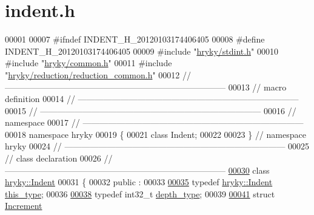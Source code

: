\hypertarget{indent_8h_source}{\section{indent.\-h}
}

\begin{DoxyCode}
00001 
00007 \textcolor{preprocessor}{#ifndef INDENT\_H\_20120103174406405}
00008 \textcolor{preprocessor}{}\textcolor{preprocessor}{#define INDENT\_H\_20120103174406405}
00009 \textcolor{preprocessor}{}\textcolor{preprocessor}{#include "\hyperlink{stdint_8h}{hryky/stdint.h}"}
00010 \textcolor{preprocessor}{#include "\hyperlink{common_8h}{hryky/common.h}"}
00011 \textcolor{preprocessor}{#include "\hyperlink{reduction__common_8h}{hryky/reduction/reduction_common.h}"}
00012 \textcolor{comment}{//
      ------------------------------------------------------------------------------}
00013 \textcolor{comment}{// macro definition}
00014 \textcolor{comment}{//
      ------------------------------------------------------------------------------}
00015 \textcolor{comment}{//
      ------------------------------------------------------------------------------}
00016 \textcolor{comment}{// namespace}
00017 \textcolor{comment}{//
      ------------------------------------------------------------------------------}
00018 \textcolor{keyword}{namespace }hryky
00019 \{
00021     \textcolor{keyword}{class }Indent;
00022     
00023 \} \textcolor{comment}{// namespace hryky}
00024 \textcolor{comment}{//
      ------------------------------------------------------------------------------}
00025 \textcolor{comment}{// class declaration}
00026 \textcolor{comment}{//
      ------------------------------------------------------------------------------}
\hypertarget{indent_8h_source_l00030}{}\hyperlink{classhryky_1_1_indent}{00030} \textcolor{comment}{}\textcolor{keyword}{class }\hyperlink{classhryky_1_1_indent}{hryky::Indent}
00031 \{
00032 \textcolor{keyword}{public} :
00033 
\hypertarget{indent_8h_source_l00035}{}\hyperlink{classhryky_1_1_indent_acbe5e44b7c58ede382914e8a3f7d2987}{00035}     \textcolor{keyword}{typedef} \hyperlink{classhryky_1_1_indent}{hryky::Indent} \hyperlink{classhryky_1_1_indent_acbe5e44b7c58ede382914e8a3f7d2987}{this_type};
00036 
\hypertarget{indent_8h_source_l00038}{}\hyperlink{classhryky_1_1_indent_a38d8402509b64e77009a1a86b6be4939}{00038}     \textcolor{keyword}{typedef} int32\_t \hyperlink{classhryky_1_1_indent_a38d8402509b64e77009a1a86b6be4939}{depth_type};
00039 
\hypertarget{indent_8h_source_l00041}{}\hyperlink{structhryky_1_1_indent_1_1_increment}{00041}     \textcolor{keyword}{struct }\hyperlink{structhryky_1_1_indent_1_1_increment}{Increment}

\end{DoxyCode}
